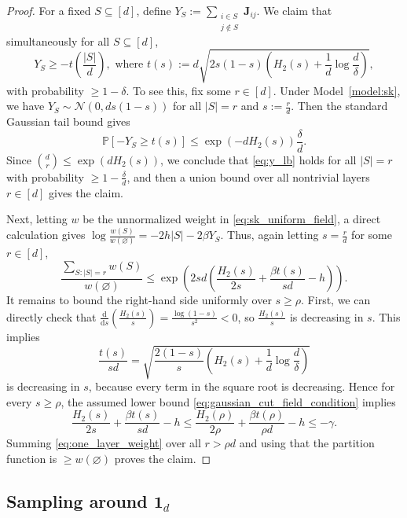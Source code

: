 \documentclass[11pt]{article}
\newcommand{\defeq}{:=}
\newcommand{\1}{\mathbf{1}}
\newcommand{\0}{\mathbf{0}}
\newcommand{\Par}[1]{\left(#1\right)}
\newcommand{\Prob}{\mathbb{P}}
\renewcommand{\Pr}{\Prob}
\newcommand{\mj}{{\mathbf{J}}}
\begin{document}
\begin{proof}
For a fixed $S\subseteq[d]$, define \( Y_S\defeq\sum_{\substack{i\in S\\j\notin S}}\mj_{ij}\). We claim that simultaneously for all $S \subseteq [d]$,
\begin{equation}\label{eq:y_lb}Y_S \ge -t\Par{\frac{|S|}{d}},\text{ where } t(s) \defeq d\sqrt{2s(1 - s)\Par{H_2(s) + \frac 1d \log \frac d \delta}},\end{equation}
with probability $\ge 1 - \delta$. To see this, fix some $r \in [d]$. 
Under Model~\ref{model:sk}, we have $Y_S \sim \mathcal N(0, ds(1-s))$ for all $|S| = r$ and $s \defeq \frac r d$. Then the standard Gaussian tail bound gives
\[
    \Pr[-Y_S\ge t(s)]
    \le
    \exp\Par{-dH_2(s)}
    \frac{\delta}{d}.
\]
Since $\binom dr\le\exp(dH_2(s))$, we conclude that \eqref{eq:y_lb} holds for all $|S| = r$ with probability $\ge 1 - \frac \delta d$, and then a union bound over all nontrivial layers $r \in [d]$ gives the claim.

Next, letting $w$ be the unnormalized weight in \eqref{eq:sk_uniform_field}, a direct calculation gives
$\log\frac{w(S)}{w(\varnothing)}
    =
    -2h|S|-2\beta Y_S$.
Thus, again letting $s = \frac r d$ for some $r \in [d]$,
\begin{equation}\label{eq:one_layer_weight}
    \frac{\sum_{S:|S|=r}w(S)}{w(\varnothing)}
    \le
    \exp\Par{
        2sd
        \Par{
            \frac{H_2(s)}{2s}
            +
            \frac{\beta t(s)}{sd}
            -
            h
        }
    }.
\end{equation}
It remains to bound the right-hand side uniformly over $s \ge \rho$. First, we can directly check that $\frac{\mathrm d}{\mathrm ds}(\frac{H_2(s)}{s}) = \frac{\log(1 - s)}{s^2} < 0$, so $\frac{H_2(s)}{s}$ is decreasing in $s$. This implies
\[\frac{t(s)}{sd} = \sqrt{\frac{2(1-s)}{s}\Par{H_2(s) + \frac 1 d \log \frac d \delta}}\]
is decreasing in $s$, because every term in the square root is decreasing. Hence for every $s \ge \rho$, the assumed lower bound \eqref{eq:gaussian_cut_field_condition} implies
\[\frac{H_2(s)}{2s} + \frac{\beta t(s)}{sd} - h \le \frac{H_2(\rho)}{2\rho} + \frac{\beta t(\rho)}{\rho d} -h \le -\gamma.\]
Summing \eqref{eq:one_layer_weight} over all $r>\rho d$ and using that the
partition function is $\ge w(\varnothing)$ proves the claim.
\end{proof}

\subsection{Sampling around $\1_d$}
\label{ssec:all_one_sampling}
\label{ssec:gaussian_cut_concentration}
\end{document}
